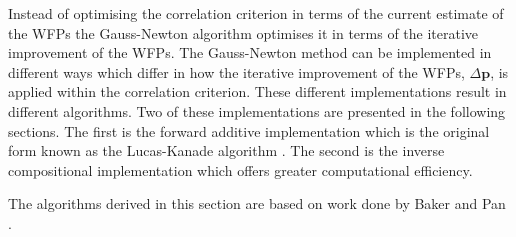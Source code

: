 \documentclass[12pt,oneside,openany,a4paper, %
english, %
masters-t, goldenblock]{usthesis}
\begin{document}
Instead of optimising the correlation criterion in terms of the current estimate of the WFPs the Gauss-Newton algorithm optimises it in terms of the iterative improvement of the WFPs. The Gauss-Newton method can be implemented in different ways which differ in how the iterative improvement of the WFPs, $\Delta \bm{p}$, is applied within the correlation criterion. These different implementations result in different algorithms. Two of these implementations are presented in the following sections. The first is the forward additive implementation which is the original form known as the Lucas-Kanade algorithm \cite{lucas1981iterative}. The second is the inverse compositional implementation which offers greater computational efficiency.

The algorithms derived in this section are based on work done by Baker \cite{lucasUnifying} and Pan \cite{panfast}.
\end{document}
